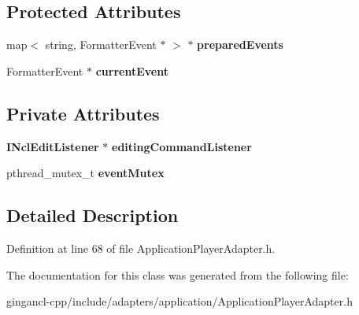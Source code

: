 \subsection*{Protected Attributes}
\begin{CompactItemize}
\item 
map$<$ string, FormatterEvent $\ast$ $>$ $\ast$ {\bf preparedEvents}\label{classbr_1_1pucrio_1_1telemidia_1_1ginga_1_1ncl_1_1adapters_1_1application_1_1ApplicationPlayerAdapter_a43d2bb8f3756816973fe3cefcdcd569}

\item 
FormatterEvent $\ast$ {\bf currentEvent}\label{classbr_1_1pucrio_1_1telemidia_1_1ginga_1_1ncl_1_1adapters_1_1application_1_1ApplicationPlayerAdapter_513496d6a12bbfe8aa02a68a3572701c}

\end{CompactItemize}
\subsection*{Private Attributes}
\begin{CompactItemize}
\item 
{\bf INclEditListener} $\ast$ {\bf editingCommandListener}\label{classbr_1_1pucrio_1_1telemidia_1_1ginga_1_1ncl_1_1adapters_1_1application_1_1ApplicationPlayerAdapter_03c0933ef4583b4d5d6bffee883712ae}

\item 
pthread\_\-mutex\_\-t {\bf eventMutex}\label{classbr_1_1pucrio_1_1telemidia_1_1ginga_1_1ncl_1_1adapters_1_1application_1_1ApplicationPlayerAdapter_8a8305704a13064a359c8d9cd98597df}

\end{CompactItemize}


\subsection{Detailed Description}




Definition at line 68 of file ApplicationPlayerAdapter.h.

The documentation for this class was generated from the following file:\begin{CompactItemize}
\item 
gingancl-cpp/include/adapters/application/ApplicationPlayerAdapter.h\end{CompactItemize}
